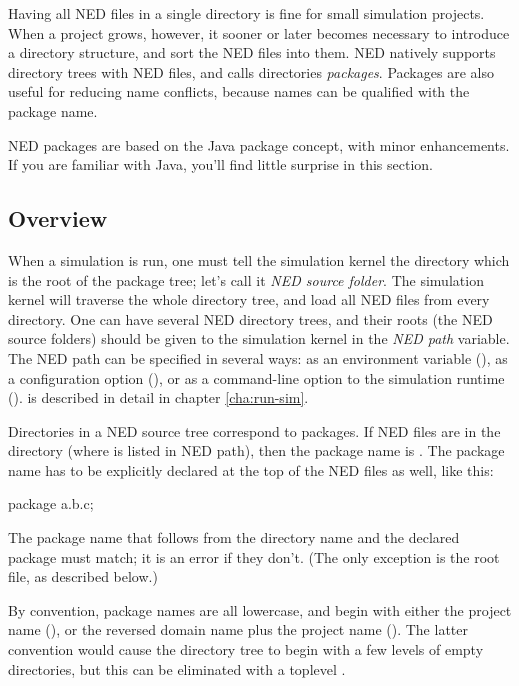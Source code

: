 Having all NED files in a single directory is fine for small simulation projects.
When a project grows, however, it sooner or later becomes
necessary to introduce a directory structure, and sort the NED files into
them. NED natively supports directory trees with NED files, and calls
directories \textit{packages}. Packages are also useful for reducing
name conflicts, because names can be qualified with the package name.

\begin{note}
    NED packages are based on the Java package concept, with minor
    enhancements. If you are familiar with Java, you'll find little
    surprise in this section.
\end{note}

\subsection{Overview}
\label{sec:ned-lang:packages-overview}

When a simulation is run, one must tell the simulation kernel the
directory which is the root of the package tree; let's call it
\textit{NED source folder}. The simulation kernel will traverse
the whole directory tree, and load all NED files from every directory.
One can have several NED directory trees, and their roots (the NED source
folders) should be given to the simulation kernel in the \textit{NED path}
variable. The NED path can be specified in several ways: as an environment
variable (), as a configuration option (),
or as a command-line option to the simulation runtime ().  is
described in detail in chapter \ref{cha:run-sim}.

Directories in a NED source tree correspond to packages. If NED files are
in the  directory (where  is listed in NED
path), then the package name is . The package name has to be
explicitly declared at the top of the NED files as well, like this:

\begin{ned}
package a.b.c;
\end{ned}

The package name that follows from the directory name and the declared
package must match; it is an error if they don't. (The only exception
is the root  file, as described below.)

By convention, package names are all lowercase, and begin with either
the project name (), or the reversed domain name plus the
project name (). The latter convention
would cause the directory tree to begin with a few levels of empty
directories, but this can be eliminated with a toplevel .

